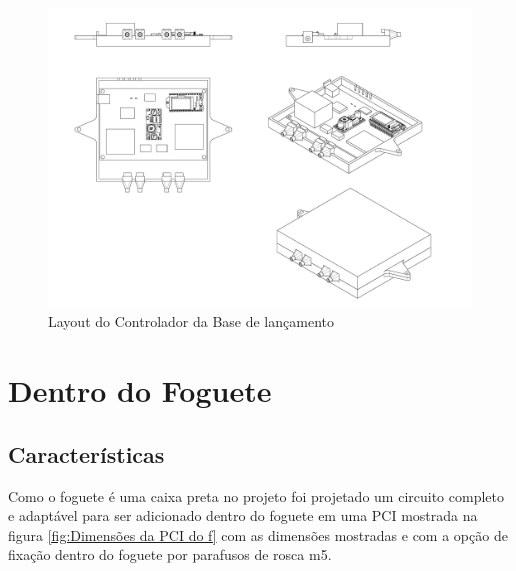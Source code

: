 \begin{figure}[H]
  \centering
  \includegraphics[scale=0.2]{Figuras/Vistas_caseelet.pdf}
  \caption{Layout do Controlador da Base de lançamento}
  \label{fig:suporte_explode}
\end{figure}





\section*{Dentro do Foguete}
\subsection*{Características}
\par Como o foguete é  uma caixa preta no projeto foi projetado um circuito completo e adaptável para ser adicionado dentro do foguete em uma PCI mostrada na figura \ref{fig:Dimensões da PCI do f} com as dimensões mostradas e com a opção de fixação dentro do foguete por parafusos de rosca m5.

